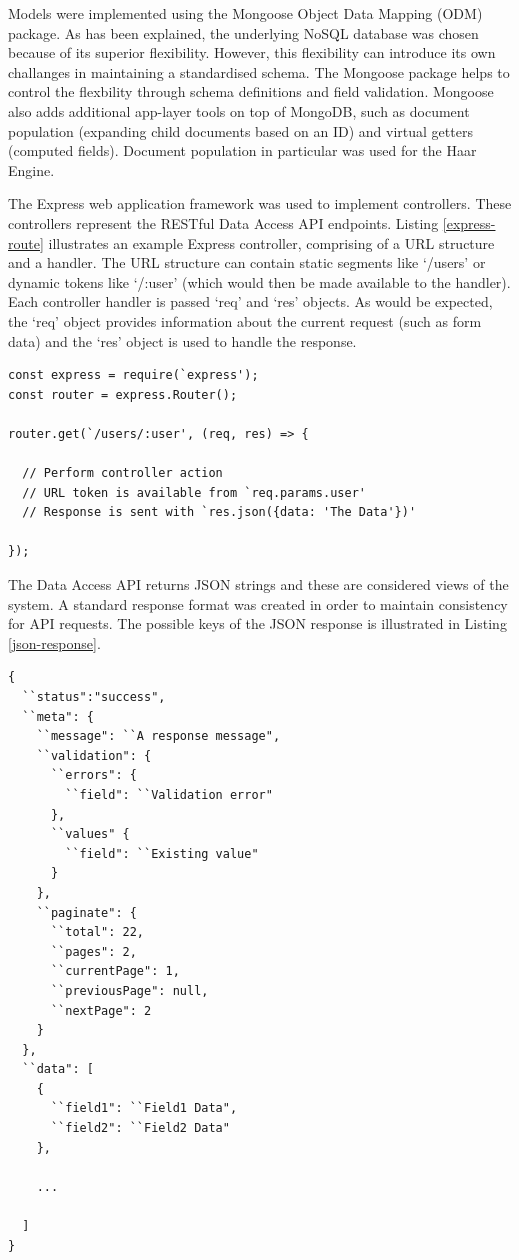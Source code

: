       Models were implemented using the Mongoose Object Data Mapping (ODM) package. As has been explained, the underlying NoSQL database was chosen because of its superior flexibility. However, this flexibility can introduce its own challanges in maintaining a standardised schema. The Mongoose package helps to control the flexbility through schema definitions and field validation. Mongoose also adds additional app-layer tools on top of MongoDB, such as document population (expanding child documents based on an ID) and virtual getters (computed fields). Document population in particular was used for the Haar Engine.

      The Express web application framework was used to implement controllers. These controllers represent the RESTful Data Access API endpoints. Listing \ref{express-route} illustrates an example Express controller, comprising of a URL structure and a handler. The URL structure can contain static segments like `/users' or dynamic tokens like `/:user' (which would then be made available to the handler). Each controller handler is passed `req' and `res' objects. As would be expected, the `req' object provides information about the current request (such as form data) and the `res' object is used to handle the response.

      \begin{lstlisting}[caption=An example Express controller,
        label=express-route,
        captionpos=b,
        numbers=none,
        frame=single,
        float]
const express = require(`express');
const router = express.Router();

router.get(`/users/:user', (req, res) => {
  
  // Perform controller action
  // URL token is available from `req.params.user'
  // Response is sent with `res.json({data: 'The Data'})'

});
      \end{lstlisting}

      The Data Access API returns JSON strings and these are considered views of the system. A standard response format was created in order to maintain consistency for API requests. The possible keys of the JSON response is illustrated in Listing \ref{json-response}.
      
      \begin{lstlisting}[caption=The standard JSON format,
        label=json-response,
        captionpos=b,
        numbers=none,
        frame=single,
        float]
{
  ``status":"success",
  ``meta": {
    ``message": ``A response message",
    ``validation": {
      ``errors": {
        ``field": ``Validation error"
      },
      ``values" {
        ``field": ``Existing value"
      }
    },
    ``paginate": {
      ``total": 22,
      ``pages": 2,
      ``currentPage": 1,
      ``previousPage": null,
      ``nextPage": 2
    }
  },
  ``data": [
    {
      ``field1": ``Field1 Data",
      ``field2": ``Field2 Data"
    },

    ...

  ]
}
      \end{lstlisting}
